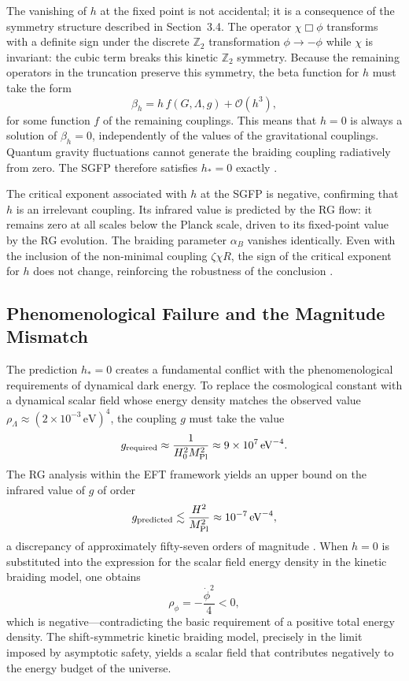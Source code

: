 \documentclass[12pt,a4paper]{article}
\begin{document}
The vanishing of $h$ at the fixed point is not accidental; it is a consequence
of the symmetry structure described in Section~3.4. The operator $\chi\Box\phi$
transforms with a definite sign under the discrete $\mathbb{Z}_2$ transformation
$\phi \to -\phi$ while $\chi$ is invariant: the cubic term breaks this kinetic
$\mathbb{Z}_2$ symmetry. Because the remaining operators in the truncation
preserve this symmetry, the beta function for $h$ must take the form
\begin{equation}
\beta_h = h\,f(G,\Lambda,g) + \mathcal{O}(h^3),
\end{equation}
for some function $f$ of the remaining couplings. This means that $h = 0$ is
always a solution of $\beta_h = 0$, independently of the values of the
gravitational couplings. Quantum gravity fluctuations cannot generate the
braiding coupling radiatively from zero. The SGFP therefore satisfies
$h_* = 0$ exactly \cite{EichhornLinoWagner2023}.

The critical exponent associated with $h$ at the SGFP is negative, confirming
that $h$ is an irrelevant coupling. Its infrared value is predicted by the RG
flow: it remains zero at all scales below the Planck scale, driven to its
fixed-point value by the RG evolution. The braiding parameter $\alpha_B$
vanishes identically. Even with the inclusion of the non-minimal coupling
$\zeta\chi R$, the sign of the critical exponent for $h$ does not change,
reinforcing the robustness of the conclusion \cite{EichhornLinoWagner2023,
EichhornSchiffer2022handbook}.

\subsection{Phenomenological Failure and the Magnitude Mismatch}

The prediction $h_* = 0$ creates a fundamental conflict with the
phenomenological requirements of dynamical dark energy. To replace the
cosmological constant with a dynamical scalar field whose energy density
matches the observed value $\rho_\Lambda \approx (2\times 10^{-3}\,\text{eV})^4$,
the coupling $g$ must take the value
\begin{equation}
g_{\rm required} \approx \frac{1}{H_0^2 M_{\rm Pl}^2}
\approx 9 \times 10^7\,\text{eV}^{-4}.
\end{equation}
The RG analysis within the EFT framework yields an upper bound on the
infrared value of $g$ of order
\begin{equation}
g_{\rm predicted} \lesssim \frac{H^2}{M_{\rm Pl}^2}
\approx 10^{-7}\,\text{eV}^{-4},
\end{equation}
a discrepancy of approximately fifty-seven orders of magnitude
\cite{EichhornLinoWagner2023}. When $h = 0$ is substituted into the expression
for the scalar field energy density in the kinetic braiding model, one obtains
\begin{equation}
\rho_\phi = -\frac{\dot\phi^2}{4} < 0,
\end{equation}
which is negative---contradicting the basic requirement of a positive total
energy density. The shift-symmetric kinetic braiding model, precisely in the
limit imposed by asymptotic safety, yields a scalar field that contributes
negatively to the energy budget of the universe.
\end{document}
